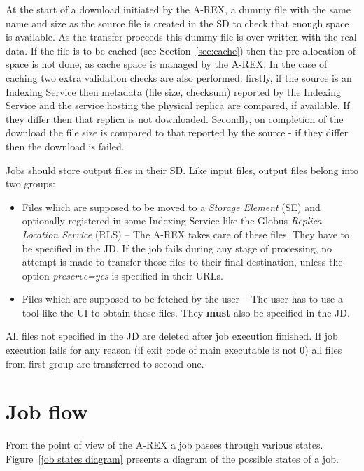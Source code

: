 \documentclass{article}                            %
\begin{document}
At the start of a download initiated by the A-REX, a dummy file with
the same name and size as the source file is created in the SD to
check that enough space is available. As the transfer proceeds this
dummy file is over-written with the real data. If the file is to be
cached (see Section~\ref{sec:cache}) then the pre-allocation of space
is not done, as cache space is managed by the A-REX. In the case of
caching two extra validation checks are also performed: firstly, if
the source is an Indexing Service then metadata (file size, checksum)
reported by the Indexing Service and the service hosting the physical
replica are compared, if available. If they differ then that replica
is not downloaded. Secondly, on completion of the download the file
size is compared to that reported by the source - if they differ then
the download is failed.

Jobs should store output files in their SD. Like input files, output
files belong into two groups:

\begin{itemize}

\item Files which are supposed to be moved to a \emph{Storage Element}
  (SE) and optionally registered in some Indexing Service like the
  Globus \emph{Replica Location Service} (RLS) -- The A-REX takes care
  of these files. They have to be specified in the JD. If the job
  fails during any stage of processing, no attempt is made to transfer
  those files to their final destination, unless the option
  \emph{preserve=yes} is specified in their URLs.

\item Files which are supposed to be fetched by the user -- The user
  has to use a tool like the UI to obtain these files. They
  \textbf{must} also be specified in the JD.
\end{itemize}

All files not specified in the JD are deleted after job execution
finished. If job execution fails for any reason (if exit code of main
executable is not 0) all files from first group are transferred to
second one.

\section{Job flow\label{Section:Job Flow}}

From the point of view of the A-REX a job passes through various states.
Figure~\ref{job states diagram} presents a diagram of the possible
states of a job.
\end{document}
